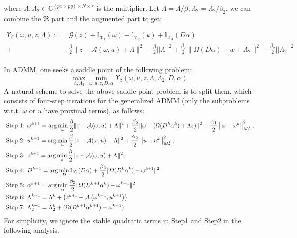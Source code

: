 \documentclass{article}
\numberwithin{equation}{section}
\begin{document}
where $\Lambda,\Lambda_2 \in \mathbb{C}^{(px \times py) \times N \times r}$ is the multiplier.
Let $\Lambda = \Lambda / \beta, \Lambda_2 = \Lambda_2 / \beta_2$, we can combine the $\Re$ part and the augmented part to get:

\begin{equation}
\begin{aligned}
\Upsilon_{\beta}(\omega, u, z, \Lambda):=&\mathcal{G}(z)+\mathbb{I}_{\mathcal{X}_{1}}(\omega)+\mathbb{I}_{\mathcal{X}_{2}}(u)+ \mathbb{I}_{\mathcal{X}_{3}}(D\alpha)  \\
+&\frac{\beta}{2}\|z-\mathcal{A}(\omega, u) + \Lambda \|^{2} - \frac{\beta}{2}||\Lambda||^2 +\frac{\beta_2}{2}\| \Omega(D\alpha) - w + \Lambda_2\|^{2} - \frac{\beta_2}{2}||\Lambda_2||^2 \\
\end{aligned}
\end{equation} 

In ADMM, one seeks a saddle point of the following problem:
$$
\max _{\Lambda,\Lambda_2} \min _{\omega, u, z,D,\alpha} \Upsilon_{\beta}(\omega, u, z, \Lambda,\Lambda_2,D,\alpha)
$$
A natural scheme to solve the above saddle point problem is to split them, which consists of four-step iterations for the generalized ADMM (only the subproblems w.r.t. $\omega$ or $u$ have proximal terms), as follows:
\begin{align}
\text { Step 1: } & \omega^{k+1}=\arg \min _{\omega} \frac{\beta}{2}\|z-\mathcal{A}(\omega, u) + \Lambda \|^{2} +
\frac{\beta_{2}}{2}||\omega - (\Omega(D^k\alpha^k) + \Lambda_2)||^2 + 
\frac{\alpha_{1}}{2}\left\|\omega-\omega^{k}\right\|_{M_{1}^{k}}^{2}, \notag \\
 \text { Step 2: } & u^{k+1}=\arg \min _{u} \frac{\beta}{2}\|z-\mathcal{A}(\omega, u) + \Lambda \|^{2} +\frac{\alpha_{2}}{2}\left\|u-u^{k}\right\|_{M_{2}^{k}}^{2}, \notag \\ \text { Step 3: } & z^{k+1}=\arg \min _{z} \frac{\beta}{2}\|z-\mathcal{A}(\omega, u) + \Lambda \|^{2} , \notag \\
 \text { Step 4: } & D^{k+1}=\arg \min _{D} \mathbb{I}_{\mathcal{X}_{3}}(D\alpha) +
  \frac{\beta_2}{2}\| \Omega(D^k\alpha^k) - \omega^{k+1}\|^{2} \notag \\
 \text { Step 5: } & \alpha^{k+1}=\arg \min _{\alpha}  \frac{\beta_2}{2}\| \Omega(D^{k+1}\alpha^k) - \omega^{k+1}\|^{2}\notag \\
  \text { Step 6: } &
 \Lambda^{k+1}=\Lambda^{k}+\left(z^{k+1}-\mathcal{A}\left(\omega^{k+1}, u^{k+1}\right)\right)  \label{Lup}\\
 \text { Step 7: } & \Lambda_2^{k+1}=\Lambda_2^{k}+ (\Omega(D^{k+1}\alpha^{k+1}) - \omega^{k+1}) \label{L2up}
 \end{align}
For simplicity, we ignore the stable quadratic terms in Step1 and Step2 in the following analysis.
\end{document}
